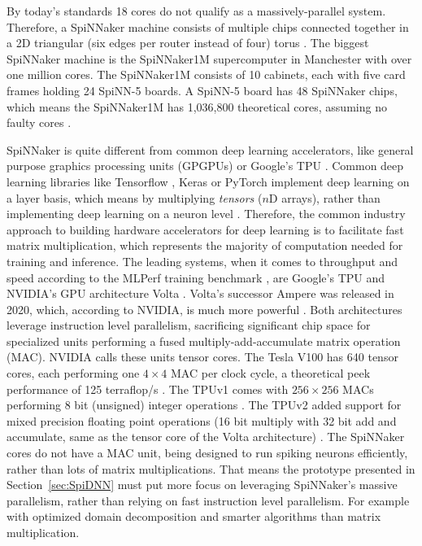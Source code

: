 \documentclass[]{article}
\begin{document}
By today's standards 18 cores do not qualify as a massively-parallel
system.
Therefore, a SpiNNaker machine consists of multiple chips connected
together in a 2D triangular (six edges per router instead of four)
torus \citep{furber_et_al_2020}.
The biggest SpiNNaker machine is the SpiNNaker1M supercomputer in
Manchester with over one million cores.
The SpiNNaker1M consists of 10 cabinets, each with five card frames
holding 24 SpiNN-5 boards.
A SpiNN-5 board has 48 SpiNNaker chips, which means the SpiNNaker1M
has 1,036,800 theoretical cores, assuming no faulty cores
\citep{furber_et_al_2020}.

SpiNNaker is quite different from common deep learning accelerators,
like general purpose graphics processing units (GPGPUs) or Google's
TPU \citep{jouppi_et_al_2017}.
Common deep learning libraries like Tensorflow
\citep{abadi_et_al_2015}, Keras \citep{keras} or PyTorch
\citep{paszke_et_al_2019} implement
deep learning on a layer basis, which means by multiplying
\textit{tensors} ($n$D arrays), rather than implementing deep learning
on a neuron level \citep{goodfellow_et_al_2016}.
Therefore, the common industry approach to building hardware
accelerators for deep learning is to facilitate fast matrix
multiplication, which represents the majority of computation needed
for training and inference.
The leading systems, when it comes to throughput and speed according
to the MLPerf training benchmark \citep{mlperf_2019}, are Google's
TPU \citep{jouppi_et_al_2017} and NVIDIA's GPU architecture
Volta \citep{durant_et_al_2017}.
Volta's successor Ampere was released in 2020, which, according to
NVIDIA, is much more powerful \citep{krashinsky_et_al_2020}.
Both architectures leverage instruction level parallelism, sacrificing
significant chip space for specialized units performing a
fused multiply-add-accumulate matrix operation (MAC).
NVIDIA calls these units tensor cores. The Tesla V100 has 640 tensor
cores, each performing one $4\times 4$ MAC per clock cycle, a
theoretical peek performance of 125 terraflop/s
\citep{markidis_et_al_2018}.
The TPUv1 comes with $256\times256$ MACs performing 8 bit (unsigned)
integer operations \citep{jouppi_et_al_2017}.
The TPUv2 added support for mixed precision floating point operations
(16 bit multiply with 32 bit add and accumulate, same as the
tensor core of the Volta architecture)
\citep{kennedy_2017, markidis_et_al_2018}.
The SpiNNaker cores do not have a MAC unit, being designed to run
spiking neurons efficiently, rather than lots of matrix
multiplications.
That means the prototype presented in Section~\ref{sec:SpiDNN} must
put more focus on leveraging SpiNNaker's massive parallelism, rather
than relying on fast instruction level parallelism.
For example with optimized domain decomposition and smarter algorithms
than matrix multiplication.
\end{document}
